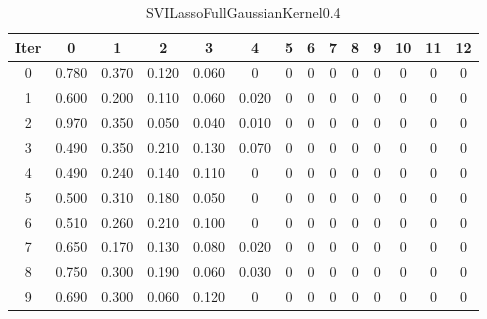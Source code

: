 \begin{table}
	\begin{center}
		\begin{tabular}{|c|c|c|c|c|c|c|c|c|c|c|c|c|c|}
			\hline
			Iter & 0 & 1 & 2 & 3 & 4 & 5 & 6 & 7 & 8 & 9 & 10 & 11 & 12 \\
			\hline
			0 & 0.780 & 0.370 & 0.120 & 0.060 & 0 & 0 & 0 & 0 & 0 & 0 & 0 & 0 & 0 \\
			\hline
			1 & 0.600 & 0.200 & 0.110 & 0.060 & 0.020 & 0 & 0 & 0 & 0 & 0 & 0 & 0 & 0 \\
			\hline
			2 & 0.970 & 0.350 & 0.050 & 0.040 & 0.010 & 0 & 0 & 0 & 0 & 0 & 0 & 0 & 0 \\
			\hline
			3 & 0.490 & 0.350 & 0.210 & 0.130 & 0.070 & 0 & 0 & 0 & 0 & 0 & 0 & 0 & 0 \\
			\hline
			4 & 0.490 & 0.240 & 0.140 & 0.110 & 0 & 0 & 0 & 0 & 0 & 0 & 0 & 0 & 0 \\
			\hline
			5 & 0.500 & 0.310 & 0.180 & 0.050 & 0 & 0 & 0 & 0 & 0 & 0 & 0 & 0 & 0 \\
			\hline
			6 & 0.510 & 0.260 & 0.210 & 0.100 & 0 & 0 & 0 & 0 & 0 & 0 & 0 & 0 & 0 \\
			\hline
			7 & 0.650 & 0.170 & 0.130 & 0.080 & 0.020 & 0 & 0 & 0 & 0 & 0 & 0 & 0 & 0 \\
			\hline
			8 & 0.750 & 0.300 & 0.190 & 0.060 & 0.030 & 0 & 0 & 0 & 0 & 0 & 0 & 0 & 0 \\
			\hline
			9 & 0.690 & 0.300 & 0.060 & 0.120 & 0 & 0 & 0 & 0 & 0 & 0 & 0 & 0 & 0 \\
			\hline
		\end{tabular}
	\end{center}
	\caption{SVILassoFullGaussianKernel0.4}
\end{table}